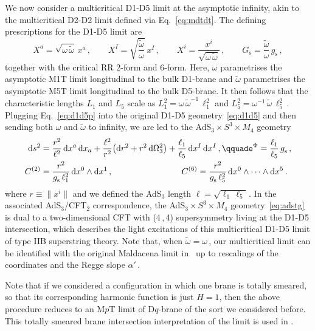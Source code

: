 \documentclass[11pt]{article}
\newcommand{\be}{\begin{equation}}
\newcommand{\ee}{\end{equation}}
\renewcommand{\tilde}[1]{\widetilde{#1}}
\newcommand{\dd}{\mathrm{d}}
\begin{document}
We now consider a multicritical D1-D5 limit at the asymptotic infinity, akin to the multicritical D2-D2 limit defined via Eq.~\eqref{eq:mdtdt}. The defining prescriptions for the D1-D5 limit are
%
\be \label{eq:d1d5p}
    X^a = \sqrt{\omega \, \tilde{\omega}} \, x^a \,,
        \qquad%
    X^I = \sqrt{\frac{\tilde{\omega}}{\omega}} \, x^I \,,
        \qquad%
    X^i = \frac{x^i}{\sqrt{\omega \, \tilde{\omega}}}\,, 
        \qquad
    G_\text{s} = \frac{\tilde{\omega}}{\omega} \, g_\text{s} \,,
\ee
%
together with the critical RR $2$-form and $6$-form.
Here, $\omega$ parametrises the asymptotic M1T limit longitudinal to the bulk D1-brane and $\tilde{\omega}$ parametrises the asymptotic M5T limit longitudinal to the bulk D5-brane. It then follows that the characteristic lengths $L_1$ and $L_5$ scale as $L_1^2 = \omega \, \tilde{\omega}^{-1} \, \ell_1^2$ and $L_5^2 = \omega^{-1} \, \tilde{\omega} \, \ell_5^2$\,. Plugging Eq.~\eqref{eq:d1d5p} into the original D1-D5 geometry~\eqref{eq:d1d5} and then sending both $\omega$ and $\tilde{\omega}$ to infinity, we are led to the AdS${}_3\times S^3 \times M_4$ geometry
\begin{subequations} \label{eq:adstg}
\begin{align}
    \dd s^2 & = \frac{r^2}{\ell^2} \, \dd x^a \, \dd x_a + \frac{\ell^2}{r^2} \bigl( \dd r^2 + r^2 \, \dd \Omega_3^2 \bigr) + \frac{\ell_1}{\ell_5} \, \dd x^I \, \dd x^I\,,
        \qquad%
    e^\Phi = \frac{\ell_1}{\ell_5} \, g^{}_\text{s}\,, \\
    C^{(2)} & = \frac{r^2}{g^{}_\text{s} \, \ell_1^2} \, \dd x^0 \wedge \dd x^1 \,,
        \hspace{2.85cm}%
    C^{(6)} = \frac{r^2}{g^{}_\text{s} \, \ell_5^2} \, \dd x^0 \wedge \cdots \wedge \dd x^5 \,.
\end{align}
\end{subequations}
%
where $r \equiv \|x^i\|$ and we defined the AdS${}_3$ length $\ell = \sqrt{\ell_1 \, \ell_5}$\,. In the associated AdS${}_3$/CFT${}_2$ correspondence, the AdS${}_3\times S^3 \times M_4$ geometry~\eqref{eq:adstg} is dual to a two-dimensional CFT with (4\,,\,4) supersymmetry living at the D1-D5 intersection, which describes the light excitations of this multicritical D1-D5 limit of type IIB superstring theory. Note that, when $\tilde{\omega} = \omega$\,, our multicritical limit can be identified with the original Maldacena limit in~\cite{Maldacena:1997re} up to rescalings of the coordinates and the Regge slope $\alpha'$\,.  

Note that if we considered a configuration in which one brane is totally smeared, so that its corresponding harmonic function is just $H=1$, then the above procedure reduces to an M$p$T limit of D$q$-brane of the sort we considered before.
This totally smeared brane intersection interpretation of the limit is used in \cite{Lambert:2024yjk}. 
\end{document}
